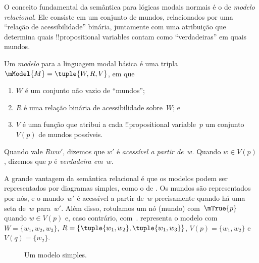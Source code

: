 \documentclass[../../../include/open-logic-section]{subfiles}
\begin{document}


O conceito fundamental da semântica para lógicas modais normais é o de
\emph{modelo relacional}. Ele consiste em um conjunto de mundos,
relacionados por uma ``relação de acessibilidade'' binária, juntamente
com uma atribuição que determina quais !!{propositional variable}s
contam como ``verdadeiras'' em quais mundos.

\begin{defn}
  Um \emph{modelo} para a linguagem modal básica é uma tripla $\mModel{M}
  = \tuple{W, R, V}$, em que
  \begin{enumerate}
  \item $W$ é um conjunto não vazio de ``mundos'';
  \item $R$ é uma relação binária de acessibilidade sobre~$W$; e
  \item $V$ é uma função que atribui a cada !!{propositional
    variable}~$p$ um conjunto $V(p)$ de mundos possíveis.
  \end{enumerate}
  Quando vale $Rww'$, dizemos que $w'$ é \emph{acessível a partir
    de}~$w$. Quando $w \in V(p)$, dizemos que $p$ é \emph{verdadeira
    em}~$w$.
\end{defn}

A grande vantagem da semântica relacional é que os modelos podem ser
representados por diagramas simples, como o de . Os
mundos são representados por nós, e o mundo~$w'$ é acessível a partir
de~$w$ precisamente quando há uma seta de~$w$ para~$w'$. Além disso,
rotulamos um nó (mundo) com~$\mTrue{p}$ quando $w \in V(p)$ e, caso
contrário, com~.  representa o modelo com
$W = \{w_1, w_2, w_3\}$, $R = \{\tuple{w_1, w_2},\tuple{w_1, w_3}\}$,
$V(p) = \{w_1, w_2\}$ e $V(q) = \{w_2\}$.

\begin{figure}
  \begin{center}
  \end{center}
  \caption{Um modelo simples.}
\end{figure}
\end{document}
